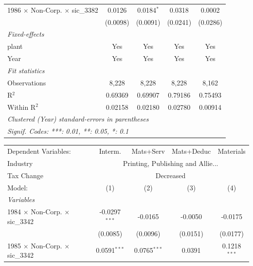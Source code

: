 \documentclass[
  12pt]{article}
\theoremstyle{definition}
\theoremstyle{remark}
\begin{document}
\begin{table}
\begin{minipage}{\linewidth}
\begin{tabular}{lcccc}
   1986 $\times$ Non-Corp. $\times$ sic\_3382    & 0.0126         & 0.0184$^{*}$   & 0.0318        & 0.0002\\   
                                                 & (0.0098)       & (0.0091)       & (0.0241)      & (0.0286)\\   
   \midrule
   \emph{Fixed-effects}\\
   plant                                         & Yes            & Yes            & Yes           & Yes\\  
   Year                                          & Yes            & Yes            & Yes           & Yes\\  
   \midrule
   \emph{Fit statistics}\\
   Observations                                  & 8,228          & 8,228          & 8,228         & 8,162\\  
   R$^2$                                         & 0.69369        & 0.69907        & 0.79186       & 0.75493\\  
   Within R$^2$                                  & 0.02158        & 0.02180        & 0.02780       & 0.00914\\  
   \midrule \midrule
   \multicolumn{5}{l}{\emph{Clustered (Year) standard-errors in parentheses}}\\
   \multicolumn{5}{l}{\emph{Signif. Codes: ***: 0.01, **: 0.05, *: 0.1}}\\
\end{tabular}
\par\endgroup
\begingroup
\centering
\begin{tabular}{lcccc}
   \tabularnewline \midrule \midrule
   Dependent Variables:                          & Interm.         & Mats+Serv      & Mats+Deduc & Materials\\  
   Industry & \multicolumn{4}{c}{Printing, Publishing and Allie...} \\ 
   Tax Change & \multicolumn{4}{c}{Decreased} \\ 
   Model:                                        & (1)             & (2)            & (3)        & (4)\\  
   \midrule
   \emph{Variables}\\
   1984 $\times$ Non-Corp. $\times$ sic\_3342    & -0.0297$^{***}$ & -0.0165        & -0.0050    & -0.0175\\   
                                                 & (0.0085)        & (0.0096)       & (0.0151)   & (0.0177)\\   
   1985 $\times$ Non-Corp. $\times$ sic\_3342    & 0.0591$^{***}$  & 0.0765$^{***}$ & 0.0391     & 0.1218$^{***}$\\   

\end{tabular}
\end{minipage}
\end{table}
\end{document}

